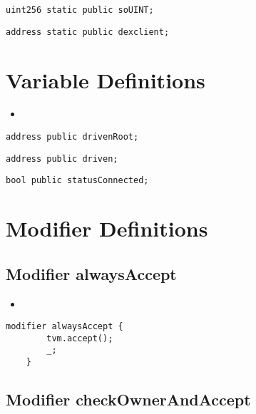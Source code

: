 \begin{lstlisting}[firstnumber=15]
  uint256 static public soUINT;
\end{lstlisting}

\begin{lstlisting}[firstnumber=16]
  address static public dexclient;
\end{lstlisting}

\section{Variable Definitions}

\begin{itemize}
\item \issueGlobal{}
\end{itemize}

\begin{lstlisting}[firstnumber=22]
  address public drivenRoot;
\end{lstlisting}

\begin{lstlisting}[firstnumber=23]
  address public driven;
\end{lstlisting}

\begin{lstlisting}[firstnumber=24]
  bool public statusConnected;
\end{lstlisting}

\section{Modifier Definitions}

\subsection{Modifier alwaysAccept}

\begin{itemize}
\item {}
\end{itemize}

\begin{lstlisting}[firstnumber=27]
	modifier alwaysAccept {
		tvm.accept();
		_;
	}
\end{lstlisting}

\subsection{Modifier checkOwnerAndAccept}

